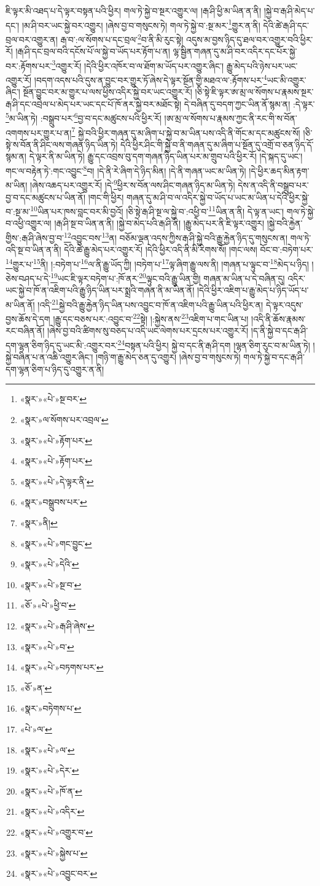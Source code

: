 ཇི་ལྟར་མི་འཐད་པ་དེ་ལྟར་བསྟན་པའི་ཕྱིར། གལ་ཏེ་སྐྱེ་བ་སྔར་འགྱུར་ལ། །རྒ་ཤི་ཕྱི་མ་ཡིན་ན་ནི། །སྐྱེ་བ་རྒ་ཤི་མེད་པ་དང་། །མ་ཤི་བར་ཡང་སྐྱེ་བར་འགྱུར། །ཞེས་བྱ་བ་གསུངས་ཏེ། གལ་ཏེ་སྐྱེ་བ་:སྔ་མར་\footnote{«སྣར་»«པེ་»སྔ་བར་}གྱུར་ན་ནི། དེའི་ཚེ་རྒ་ཤི་དང་བྲལ་བར་འགྱུར་ན། རྒ་བ་:ལ་སོགས་པ་དང་བྲལ་\footnote{«སྣར་»ལ་སོགས་པར་འབྲལ་}བ་ནི་མི་རུང་སྟེ། འདུས་མ་བྱས་ཉིད་དུ་ཐལ་བར་འགྱུར་བའི་ཕྱིར་རོ། །རྒ་ཤི་དང་བྲལ་བའི་དངོས་པོ་ལ་སྐྱེ་བ་ཡོད་པར་རྟོག་པ་ན། ལྷ་སྦྱིན་གཞན་དུ་མ་ཤི་བར་འདིར་དང་པོར་སྐྱེ་བར་:རྟོགས་པར་\footnote{«སྣར་»«པེ་»རྟོག་པར་}འགྱུར་རོ། །དེའི་ཕྱིར་འཁོར་བ་ལ་ཐོག་མ་ཡོད་པར་འགྱུར་ཞིང་། རྒྱུ་མེད་པའི་ཉེས་པར་ཡང་འགྱུར་རོ། །བདག་འདས་པའི་དུས་ན་བྱུང་བར་གྱུར་ཏོ་ཞེས་དེ་ལྟར་སྔོན་གྱི་མཐའ་ལ་:རྟོགས་པར་\footnote{«སྣར་»«པེ་»རྟོག་པར་}ཡང་མི་འགྱུར་ཞིང་། སྔོན་བྱུང་བར་མ་གྱུར་པ་ལས་ཕྱིས་འདིར་སྐྱེ་བར་ཡང་འགྱུར་རོ། །ཅི་སྟེ་ཇི་ལྟར་ཨ་མྲ་ལ་སོགས་པ་རྣམས་སྔར་རྒ་ཤི་དང་འབྲེལ་པ་མེད་པར་ཡང་དང་པོ་ཁོ་ནར་སྐྱེ་བར་མཐོང་སྟེ། དེ་བཞིན་དུ་བདག་ཀྱང་ཡིན་ནོ་སྙམ་ན། :དེ་ལྟར་\footnote{«སྣར་»«པེ་»དེ་ལྟར་ནི་}མ་ཡིན་ཏེ། :བསྒྲུབ་པར་\footnote{«སྣར་»བསྒྲུབས་པར་}བྱ་བ་དང་མཚུངས་པའི་ཕྱིར་རོ། །ཨ་མྲ་ལ་སོགས་པ་རྣམས་ཀྱང་ནི་རང་གི་ས་བོན་འགགས་པར་གྱུར་པ་ན།\footnote{«སྣར་»ནི།} སྐྱེ་བའི་ཕྱིར་གཞན་དུ་མ་ཞིག་པ་སྐྱེ་བ་མ་ཡིན་པས་འདི་ནི་གོང་མ་དང་མཚུངས་སོ། །ཅི་སྟེ་ས་བོན་ནི་ཤིང་ལས་གཞན་ཉིད་ཡིན་ཏེ། དེའི་ཕྱིར་ཤིང་གི་སྐྱེ་བ་ནི་གཞན་དུ་མ་ཞིག་པ་སྔོན་དུ་འགྲོ་བ་ཅན་ཉིད་དོ་སྙམ་ན། དེ་ལྟར་ནི་མ་ཡིན་ཏེ། རྒྱུ་དང་འབྲས་བུ་དག་གཞན་ཉིད་ཡིན་པར་མ་གྲུབ་པའི་ཕྱིར་རོ། །དེ་སྐད་དུ་ཡང་། གང་ལ་བརྟེན་ཏེ་:གང་འབྱུང་\footnote{«སྣར་»«པེ་»གང་བྱུང་}བ། །དེ་ནི་རེ་ཞིག་དེ་ཉིད་མིན། །དེ་ནི་གཞན་ཡང་མ་ཡིན་ཏེ། །དེ་ཕྱིར་ཆད་མིན་རྟག་མ་ཡིན། །ཞེས་འཆད་པར་འགྱུར་རོ། །དེ་\footnote{«སྣར་»«པེ་»དེའི་}ཕྱིར་ས་བོན་ལས་ཤིང་གཞན་ཉིད་མ་ཡིན་ཏེ། དེས་ན་འདི་ནི་བསྒྲུབ་པར་བྱ་བ་དང་མཚུངས་པ་ཡིན་ནོ། །གང་གི་ཕྱིར། གཞན་དུ་མ་ཤི་བ་ལ་འདིར་སྐྱེ་བ་ཡོད་པ་ཡང་མ་ཡིན་པ་དེའི་ཕྱིར་སྐྱེ་བ་:སྔ་མ་\footnote{«སྣར་»«པེ་»སྔ་བ་}ཡིན་པར་ཁས་བླང་བར་མི་བྱའོ། །ཅི་སྟེ་རྒ་ཤི་སྔ་ལ་སྐྱེ་བ་:འཕྱི་བ་\footnote{«ཅོ་»«པེ་»ཕྱི་བ་}ཡིན་ན་ནི། དེ་ལྟ་ན་ཡང་། གལ་ཏེ་སྐྱེ་བ་འཕྱི་འགྱུར་ལ། །རྒ་ཤི་སྔ་བ་ཡིན་ན་ནི། །སྐྱེ་བ་མེད་པའི་རྒ་ཤི་ནི། །རྒྱུ་མེད་པར་ནི་ཇི་ལྟར་འགྱུར། །སྐྱེ་བའི་རྐྱེན་གྱིས་:རྒ་ཤི་ཞེས་བྱ་བ་\footnote{«སྣར་»«པེ་»རྒ་ཤི་ཞེས་}འབྱུང་བས་\footnote{«སྣར་»«པེ་»བ་}ན། བཅོམ་ལྡན་འདས་ཀྱིས་རྒ་ཤི་སྐྱེ་བའི་རྒྱུ་རྐྱེན་ཉིད་དུ་གསུངས་ན། གལ་ཏེ་འདི་སྔ་བ་ཡིན་ན་ནི། དེའི་ཚེ་རྒྱུ་མེད་པར་འགྱུར་རོ། །དེའི་ཕྱིར་འདི་ནི་མི་རིགས་སོ། །གང་ལས། བོང་བ་:བཏེག་པར་\footnote{«སྣར་»«པེ་»བཏགས་པར་}གྱུར་པ་\footnote{«ཅོ་»ན་}ནི། །:བཏེག་པ་\footnote{«སྣར་»བཏེགས་པ་}ལ་ནི་རྒྱུ་ཡོད་ཀྱི། །བཏེག་པ་\footnote{«པེ་»ལ་}ལྟ་ཞིག་རྒྱུ་ལས་ནི། །གཞན་པ་ལྟུང་བ་\footnote{«སྣར་»«པེ་»ལ་}མེད་པ་ཉིད། །ཅེས་བཤད་པ་དེ་\footnote{«སྣར་»«པེ་»དེར་}ཡང་ཇི་ལྟར་བཏེག་པ་:ཁོ་ནར་\footnote{«སྣར་»«པེ་»ཁོ་ན་}ལྟུང་བའི་རྒྱུ་ཡིན་གྱི། གཞན་མ་ཡིན་པ་དེ་བཞིན་དུ། འདིར་ཡང་སྐྱེ་བ་ཁོ་ན་འཇིག་པའི་རྒྱུ་ཉིད་ཡིན་པར་སྨྲའི་གཞན་ནི་མ་ཡིན་ནོ། །དེའི་ཕྱིར་འཇིག་པ་རྒྱུ་མེད་པ་ཉིད་ཡོད་པ་མ་ཡིན་ནོ། །འདི་\footnote{«སྣར་»«པེ་»འདིར་}སྐྱེ་བའི་རྒྱུ་རྐྱེན་ཉིད་ཡིན་པས་འབྱུང་བ་ཁོ་ན་འཇིག་པའི་རྒྱུ་ཡིན་པའི་ཕྱིར་ན། དེ་ལྟར་འདུས་བྱས་ཆོས་དེ་དག །རྒྱུ་དང་བཅས་པར་:འབྱུང་བ་\footnote{«སྣར་»«པེ་»འགྱུར་བ་}སྟེ། །:སྐྱེས་ནས་\footnote{«སྣར་»«པེ་»སྐྱེས་པ་}འཇིག་པ་གང་ཡིན་པ། །འདི་ནི་ཆོས་རྣམས་རང་བཞིན་ནོ། །ཞེས་བྱ་བའི་ཚིགས་སུ་བཅད་པ་འདི་ཡང་ལེགས་པར་དྲངས་པར་འགྱུར་རོ། །ད་ནི་སྐྱེ་བ་དང་རྒ་ཤི་དག་ལྷན་ཅིག་ཉིད་དུ་ཡང་མི་:འགྱུར་བར་\footnote{«སྣར་»«པེ་»འབྱུང་བར་}བསྟན་པའི་ཕྱིར། སྐྱེ་བ་དང་ནི་རྒ་ཤི་དག །ལྷན་ཅིག་རུང་བ་མ་ཡིན་ཏེ། །སྐྱེ་བཞིན་པ་ན་འཆི་འགྱུར་ཞིང་། །གཉི་ག་རྒྱུ་མེད་ཅན་དུ་འགྱུར། །ཞེས་བྱ་བ་གསུངས་ཏེ། གལ་ཏེ་སྐྱེ་བ་དང་རྒ་ཤི་དག་ལྷན་ཅིག་པ་ཉིད་དུ་འགྱུར་ན་ནི། 